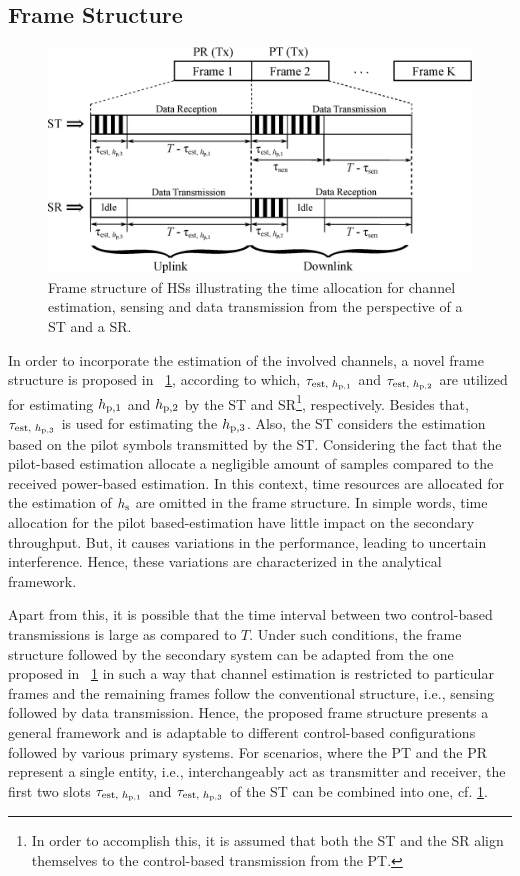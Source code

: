 \subsection{Frame Structure}
\begin{figure}[!t]
\centering
\includegraphics[width = \figscalett]{figures/Frame_Structure}
\caption{Frame structure of HSs illustrating the time allocation for channel estimation, sensing and data transmission from the perspective of a ST and a SR.} 
\label{fig:fs}
\end{figure}
In order to incorporate the estimation of the involved channels, a novel frame structure is proposed in \figurename~\ref{fig:fs}, according to which, $\tau_{\text{est, $h_{\text{p,1}}$}}$ and $\tau_{\text{est, $h_{\text{p,2}}$}}$ are utilized for estimating $h_{\text{p,1}}$ and $h_{\text{p,2}}$ by the ST and SR\footnote{In order to accomplish this, it is assumed that both the ST and the SR align themselves to the control-based transmission from the PT.}, respectively. Besides that, $\tau_{\text{est, $h_{\text{p,3}}$}}$ is used for estimating the $h_{\text{p,3}}$. Also, the ST considers the estimation based on the pilot symbols transmitted by the ST. Considering the fact that the pilot-based estimation allocate a negligible amount of samples compared to the received power-based estimation. In this context, time resources are allocated for the estimation of $h_{\text{s}}$ are omitted in the frame structure. In simple words, time allocation for the pilot based-estimation have little impact on the secondary throughput. But, it causes variations in the performance, leading to uncertain interference. Hence, these variations are characterized in the analytical framework. 

Apart from this, it is possible that the time interval between two control-based transmissions is large as compared to $T$. Under such conditions, the frame structure followed by the secondary system can be adapted from the one proposed in \figurename~\ref{fig:fs} in such a way that channel estimation is restricted to particular frames and the remaining frames follow the conventional structure, i.e., sensing followed by data transmission. Hence, the proposed frame structure presents a general framework and is adaptable to different control-based configurations followed by various primary systems. For scenarios, where the PT and the PR represent a single entity, i.e., interchangeably act as transmitter and receiver, the first two slots $\tau_{\text{est, $h_{\text{p,1}}$}}$ and $\tau_{\text{est, $h_{\text{p,3}}$}}$ of the ST can be combined into one, cf. \figurename\ref{fig:fs}. 



